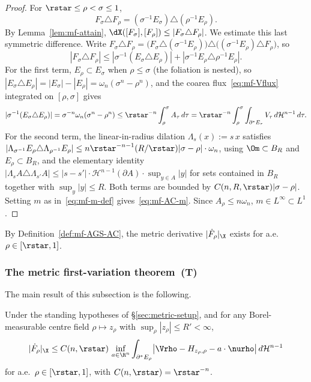 \begin{proof}
For $\rstar\le\rho<\sigma\le 1$,
\[
   F_\sigma\triangle F_\rho
   =(\sigma^{-1}E_\sigma)\triangle(\rho^{-1}E_\rho).
\]
By Lemma~\ref{lem:mf-attain},
$\dX([F_\sigma],[F_\rho])\le|F_\sigma\triangle F_\rho|$. We estimate this
last symmetric difference. Write $F_\sigma\triangle F_\rho=
\bigl(F_\sigma\triangle(\sigma^{-1}E_\rho)\bigr)\triangle
\bigl((\sigma^{-1}E_\rho)\triangle F_\rho\bigr)$, so
\begin{equation}\label{eq:mf-AC-split}
   |F_\sigma\triangle F_\rho|
   \le|\sigma^{-1}(E_\sigma\triangle E_\rho)|
      +|\sigma^{-1}E_\rho\triangle\rho^{-1}E_\rho|.
\end{equation}
For the first term, $E_\rho\subset E_\sigma$ when $\rho\le\sigma$ (the
foliation is nested), so $|E_\sigma\triangle E_\rho|=|E_\sigma|-|E_\rho|=
\omega_n(\sigma^n-\rho^n)$, and the coarea flux~\eqref{eq:mf-Vflux} integrated
on $[\rho,\sigma]$ gives
\[
   |\sigma^{-1}(E_\sigma\triangle E_\rho)|
      =\sigma^{-n}\omega_n(\sigma^n-\rho^n)
      \le\rstar^{-n}\int_\rho^\sigma A_\tau\,d\tau
      =\rstar^{-n}\int_\rho^\sigma\int_{\partial^*E_\tau}V_\tau\,
         d\mathcal H^{n-1}\,d\tau.
\]
For the second term, the linear-in-radius dilation
$\Lambda_s(x):=s\,x$ satisfies
$|\Lambda_{\sigma^{-1}}E_\rho\triangle\Lambda_{\rho^{-1}}E_\rho|\le
n\rstar^{-n-1}(R/\rstar)|\sigma-\rho|\cdot\omega_n$, using
$\Om\subset B_R$ and $E_\rho\subset B_R$, and the elementary identity
$|\Lambda_sA\triangle\Lambda_{s'}A|\le|s-s'|\cdot
\mathcal H^{n-1}(\partial A)\cdot\sup_{y\in A}|y|$ for sets contained
in $B_R$ together with $\sup_y|y|\le R$. Both terms are bounded by
$C(n,R,\rstar)|\sigma-\rho|$. Setting $m$ as in~\eqref{eq:mf-m-def}
gives~\eqref{eq:mf-AC-m}. Since $A_\rho\le n\omega_n$, $m\in L^\infty
\subset L^1$.
\end{proof}

By Definition~\ref{def:mf-AGS-AC}, the metric derivative
$|\dot F_\rho|_\X$ exists for a.e.~$\rho\in[\rstar,1]$.

\subsubsection{The metric first-variation theorem~(T)}
\label{sec:metric-T}

The main result of this subsection is the following.

\begin{theorem}\label{thm:mf-T}
Under the standing hypotheses of \S\ref{sec:metric-setup}, and for any
Borel-measurable centre field $\rho\mapsto z_\rho$ with
$\sup_\rho|z_\rho|\le R'<\infty$,
\begin{equation}\label{eq:mf-T}
   |\dot F_\rho|_\X
   \le C(n,\rstar)\,
   \inf_{a\in\R^n}\int_{\partial^*E_\rho}
       \bigl|\Vrho-H_{z_\rho,\rho}-a\cdot\nurho\bigr|
       \,d\mathcal H^{n-1}
\end{equation}
for a.e.~$\rho\in[\rstar,1]$, with $C(n,\rstar)=\rstar^{-n}$.
\end{theorem}

